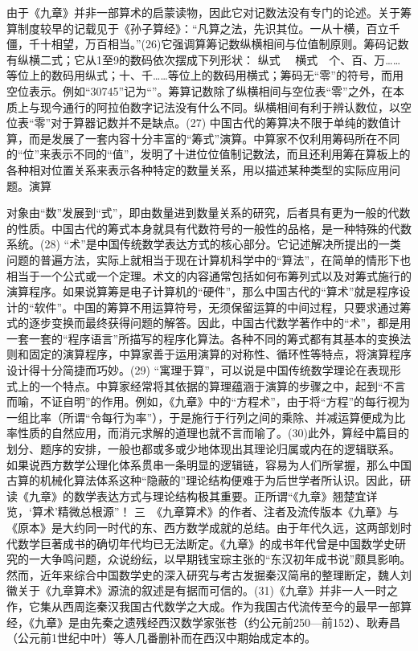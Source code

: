 \documentclass[12pt,UTF8]{ctexbook}
\begin{document}
由于《九章》并非一部算术的启蒙读物，因此它对记数法没有专门的论述。关于筹算制度较早的记载见于《孙子算经》：“凡算之法，先识其位。一从十横，百立千僵，千十相望，万百相当。”(26)它强调算筹记数纵横相间与位值制原则。筹码记数有纵横二式；它从1至9的数码依次摆成下列形状：
纵式　
横式　个、百、万……等位上的数码用纵式；十、千……等位上的数码用横式；筹码无“零”的符号，而用空位表示。例如“30745”记为“”。筹算记数除了纵横相间与空位表“零”之外，在本质上与现今通行的阿拉伯数字记法没有什么不同。纵横相间有利于辨认数位，以空位表“零”对于算器记数并不是缺点。(27)
中国古代的筹算决不限于单纯的数值计算，而是发展了一套内容十分丰富的“筹式”演算。中算家不仅利用筹码所在不同的“位”来表示不同的“值”，发明了十进位位值制记数法，而且还利用筹在算板上的各种相对位置关系来表示各种特定的数量关系，用以描述某种类型的实际应用问题。演算

对象由“数”发展到“式”，即由数量进到数量关系的研究，后者具有更为一般的代数的性质。中国古代的筹式本身就具有代数符号的一般性的品格，是一种特殊的代数系统。(28)
“术”是中国传统数学表达方式的核心部分。它记述解决所提出的一类问题的普遍方法，实际上就相当于现在计算机科学中的“算法”，在简单的情形下也相当于一个公式或一个定理。术文的内容通常包括如何布筹列式以及对筹式施行的演算程序。如果说算筹是电子计算机的“硬件”，那么中国古代的“算术”就是程序设计的“软件”。中国的筹算不用运算符号，无须保留运算的中间过程，只要求通过筹式的逐步变换而最终获得问题的解答。因此，中国古代数学著作中的“术”，都是用一套一套的“程序语言”所描写的程序化算法。各种不同的筹式都有其基本的变换法则和固定的演算程序，中算家善于运用演算的对称性、循环性等特点，将演算程序设计得十分简捷而巧妙。(29)
“寓理于算”，可以说是中国传统数学理论在表现形式上的一个特点。中算家经常将其依据的算理蕴涵于演算的步骤之中，起到“不言而喻，不证自明”的作用。例如，《九章》中的“方程术”，由于将“方程”的每行视为一组比率（所谓“令每行为率”），于是施行于行列之间的乘除、并减运算便成为比率性质的自然应用，而消元求解的道理也就不言而喻了。(30)此外，算经中篇目的划分、题序的安排，一般也都或多或少地体现出其理论归属或内在的逻辑联系。
如果说西方数学公理化体系贯串一条明显的逻辑链，容易为人们所掌握，那么中国古算的机械化算法体系这种“隐蔽的”理论结构便难于为后世学者所认识。因此，研读《九章》的数学表达方式与理论结构极其重要。正所谓“《九章》翘楚宜详览，‘算术’精微总根源”！
三　《九章算术》的作者、注者及流传版本《九章》与《原本》是大约同一时代的东、西方数学成就的总结。由于年代久远，这两部划时代数学巨著成书的确切年代均已无法断定。《九章》的成书年代曾是中国数学史研究的一大争鸣问题，众说纷纭，以早期钱宝琮主张的“东汉初年成书说”颇具影响。然而，近年来综合中国数学史的深入研究与考古发掘秦汉简帛的整理断定，魏人刘徽关于《九章算术》源流的叙述是有据而可信的。(31)《九章》并非一人一时之作，它集从西周迄秦汉我国古代数学之大成。作为我国古代流传至今的最早一部算经，《九章》是由先秦之遗残经西汉数学家张苍（约公元前250—前152）、耿寿昌（公元前1世纪中叶）等人几番删补而在西汉中期始成定本的。
\end{document}
